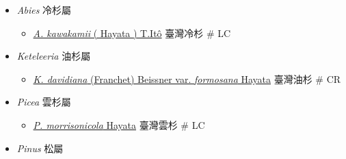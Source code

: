 
  \begin{itemize}
 \item[] \textit{Abies} 冷杉屬
                            
  \begin{itemize}
        \item[] \href{http://www.theplantlist.org/tpl1.1/search?q=Abies+kawakamii}{\textit{A. kawakamii} ( Hayata ) T.Itô}   臺灣冷杉  \# LC
  \end{itemize}
 \item[] \textit{Keteleeria} 油杉屬
                            
  \begin{itemize}
        \item[] \href{http://www.theplantlist.org/tpl1.1/search?q=Keteleeria+davidiana+var.+formosana}{\textit{K. davidiana} (Franchet) Beissner var. \textit{formosana} Hayata}  
                                    臺灣油杉  \# CR
  \end{itemize}
 \item[] \textit{Picea} 雲杉屬
                            
  \begin{itemize}
        \item[] \href{http://www.theplantlist.org/tpl1.1/search?q=Picea+morrisonicola}{\textit{P. morrisonicola} Hayata}   臺灣雲杉  \# LC
  \end{itemize}
 \item[] \textit{Pinus} 松屬
                            

\end{itemize}
